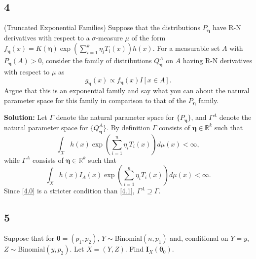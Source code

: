 \documentclass[12pt]{article}
\begin{document}
\subsection*{4}
\begin{tcolorbox}
(Truncated Exponential Families) Suppose that the distributions $P_{\bm{\eta}}$ have R-N derivatives with respect to a
$\sigma$-measure $\mu$ of the form $f_{\bm{\eta}}(x) = K(\bm{\eta}) \exp \left(  \sum_{i=1}^k \eta_i T_i(x)\right) h(x)$.
For a measurable set $A$ with $P_{\bm{\eta}}(A)>0$, consider the family of distributions $Q_{\bm{\eta}}^A$ on $A$ having R-N derivatives
with respect to $\mu$ as
\[
  g_{\bm{\eta}}(x ) \propto f_{\bm{\eta}}(x) I[x\in A].
\]
Argue that this is an exponential family and say what you can about the natural parameter space for this family in comparison to that of the $P_{\bm{\eta}}$ family.
\end{tcolorbox}

\textbf{Solution:} Let $\Gamma$ denote the natural parameter space for $\{P_{\bm{\eta}}\}$, and $\Gamma^{A}$ denote the natural parameter space for
$\{Q_{\bm{\eta}}^{A}\}$. By definition $\Gamma$ consists of $\bm{\eta} \in \mathbb{R}^{k}$ such that 
\begin{equation}
  \int_{\mathcal{X}} h(x)\exp\left( \sum_{i=1}^{n}\eta_{i}T_i(x) \right)d\mu(x) < \infty,
  \label{4.0}
\end{equation}
while $\Gamma^{A}$ consists of $\bm{\eta} \in \mathbb{R}^{k}$ such that
\begin{equation}
  \int_{X} h(x)I_A(x)\exp\left( \sum_{i=1}^{n}\eta_{i}T_i(x) \right) d\mu(x) < \infty.
  \label{4.1}
\end{equation}
Since \eqref{4.0} is a stricter condition than \eqref{4.1}, $\Gamma^{A} \supseteq \Gamma$.



\newpage

\subsection*{5}
\begin{tcolorbox}
  Suppose that for $\bm{\theta}=(p_1,p_2)$, $Y\sim$Binomial$(n,p_1)$ and, conditional on $Y=y$, $Z\sim$Binomial$(y,p_2)$. Let $X=(Y,Z)$.  Find $\bm{I}_{X}(\bm{\theta}_0)$.
\end{tcolorbox}


\newpage
\end{document}

